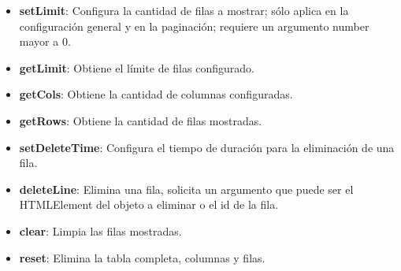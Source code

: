 \documentclass[10pt]{article}
\begin{document}
\begin{itemize}
	\item \textbf{setLimit}: Configura la cantidad de filas a mostrar; sólo aplica en la configuración general y en la paginación; requiere un argumento number mayor a 0.

	\item \textbf{getLimit}: Obtiene el límite de filas configurado.
	
	\item \textbf{getCols}: Obtiene la cantidad de columnas configuradas.
	
	\item \textbf{getRows}: Obtiene la cantidad de filas mostradas.

	\item \textbf{setDeleteTime}: Configura el tiempo de duración para la eliminación de una fila.
	
	\item \textbf{deleteLine}: Elimina una fila, solicita un argumento que puede ser el HTMLElement del objeto a eliminar o el id de la fila.
	
	\item \textbf{clear}: Limpia las filas mostradas.
	
	\item \textbf{reset}: Elimina la tabla completa, columnas y filas.
\end{itemize}
\end{document}
